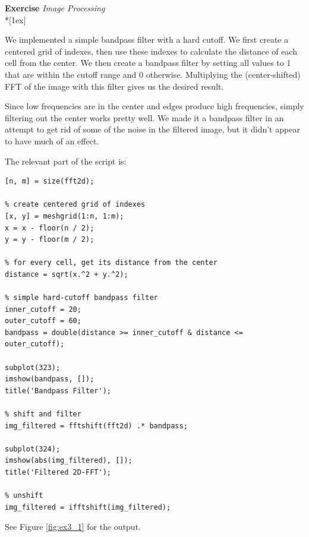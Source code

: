\documentclass[12pt,a4paper,english]{article}
\newcounter{theexercise}\setcounter{theexercise}{1}
\newenvironment{exercise}[1]%
  {\bigskip\par\noindent\begin{nopagebreak}
   \textsf{\textbf{Exercise \arabic{theexercise}}}\quad
      \textsf{\textit{#1}}\\*[1ex]%
\stepcounter{theexercise}\hspace{2ex}\end{nopagebreak}}
  {\par\pagebreak[2]}
\begin{document}
\begin{exercise}{Image Processing}
    We implemented a simple bandpass filter with a hard cutoff. We first create a centered grid of indexes, then use these indexes to calculate the distance of each cell from the center. We then create a bandpass filter by setting all values to 1 that are within the cutoff range and 0 otherwise. Multiplying the (center-shifted) FFT of the image with this filter gives us the desired result.

    Since low frequencies are in the center and edges produce high frequencies, simply filtering out the center works pretty well. We made it a bandpass filter in an attempt to get rid of some of the noise in the filtered image, but it didn't appear to have much of an effect.

    The relevant part of the script is:

    \begin{verbatim}
[n, m] = size(fft2d);

% create centered grid of indexes
[x, y] = meshgrid(1:n, 1:m);
x = x - floor(n / 2);
y = y - floor(m / 2);

% for every cell, get its distance from the center
distance = sqrt(x.^2 + y.^2);

% simple hard-cutoff bandpass filter
inner_cutoff = 20;
outer_cutoff = 60;
bandpass = double(distance >= inner_cutoff & distance <= outer_cutoff);

subplot(323);
imshow(bandpass, []);
title('Bandpass Filter');

% shift and filter
img_filtered = fftshift(fft2d) .* bandpass;

subplot(324);
imshow(abs(img_filtered), []);
title('Filtered 2D-FFT');

% unshift
img_filtered = ifftshift(img_filtered);
    \end{verbatim}

    See Figure \ref{fig:ex3_1} for the output.


\end{exercise}
\end{document}
